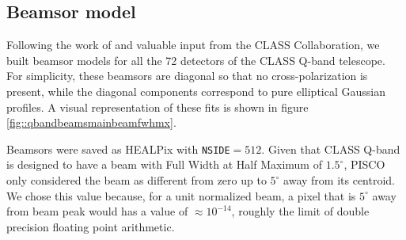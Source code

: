 \documentclass[a4paper,fleqn]{cas-dc}\sloppy
\begin{document}
	\subsection{Beamsor model}
	
	Following the work of \cite{2012SPIE.8452E..20E} and valuable input from the CLASS Collaboration, we built beamsor models for all the 72 detectors of the CLASS Q-band telescope. For simplicity, these beamsors are diagonal so that no cross-polarization is present, while the diagonal components correspond to pure elliptical Gaussian profiles. A visual representation of these fits is shown in figure \ref{fig::qbandbeamsmainbeamfwhmx}.
	
	Beamsors were saved as HEALPix with \texttt{NSIDE}$=512$. Given that CLASS Q-band is designed to have a beam with Full Width at Half Maximum of $1.5^\circ$, PISCO only considered the beam as different from zero up to $5^\circ$ away from its centroid. We chose this value because, for a unit normalized beam, a pixel that is $5^\circ$ away from beam peak would has a value of $\approx 10^{-14}$, roughly the limit of double precision floating point arithmetic. 
	
\end{document}
